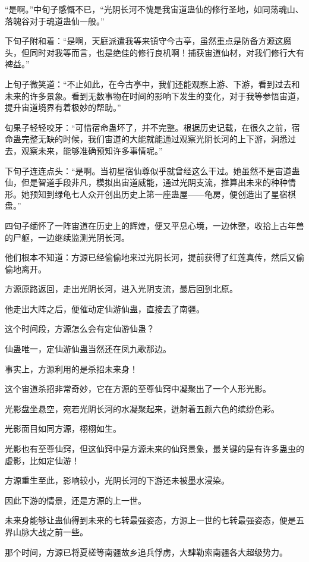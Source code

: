 \begin{this_body}
“是啊。”中旬子感慨不已，“光阴长河不愧是我宙道蛊仙的修行圣地，如同荡魂山、落魄谷对于魂道蛊仙一般。”

下旬子附和着：“是啊，天庭派遣我等来镇守今古亭，虽然重点是防备方源这魔头，但同时对我等而言，也是绝佳的修行良机啊！捕获宙道仙材，对我们修行大有裨益。”

上旬子微笑道：“不止如此，在今古亭中，我们还能观察上游、下游，看到过去和未来的许多景象。看到无数事物在时间的影响下发生的变化，对于我等参悟宙道，提升宙道境界有着极妙的帮助。”

旬果子轻轻咬牙：“可惜宿命蛊坏了，并不完整。根据历史记载，在很久之前，宿命蛊完整无缺的时候，我们宙道的大能就能通过观察光阴长河的上下游，洞悉过去，观察未来，能够准确预知许多事情呢。”

下旬子连连点头：“是啊。当初星宿仙尊似乎就曾经这么干过。她虽然不是宙道蛊仙，但是智道手段非凡，模拟出宙道威能，通过光阴支流，推算出未来的种种情形。她预知到绿龟七人众开创出历史上第一座蛊屋——龟房，便创造出了星宿棋盘。”

四旬子缅怀了一阵宙道在历史上的辉煌，便又平息心境，一边休整，收拾上古年兽的尸躯，一边继续监测光阴长河。

他们根本不知道：方源已经偷偷地来过光阴长河，提前获得了红莲真传，然后又偷偷地离开。

方源原路返回，走出光阴长河，进入光阴支流，最后回到北原。

他走出大阵之后，便催动定仙游仙蛊，直接去了南疆。

这个时间段，方源怎么会有定仙游仙蛊？

仙蛊唯一，定仙游仙蛊当然还在凤九歌那边。

事实上，方源利用的是杀招未来身！

这个宙道杀招非常奇妙，它在方源的至尊仙窍中凝聚出了一个人形光影。

光影盘坐悬空，宛若光阴长河的水凝聚起来，迸射着五颜六色的缤纷色彩。

光影面目如同方源，栩栩如生。

光影也有至尊仙窍，但这仙窍中是方源未来的仙窍景象，最关键的是有许多蛊虫的虚影，比如定仙游！

方源重生至此，影响较小，光阴长河的下游还未被墨水浸染。

因此下游的情景，还是方源的上一世。

未来身能够让蛊仙得到未来的七转最强姿态，方源上一世的七转最强姿态，便是五界山脉大战之前一些。

那个时间，方源已将夏槎等南疆故乡追兵俘虏，大肆勒索南疆各大超级势力。


\end{this_body}
